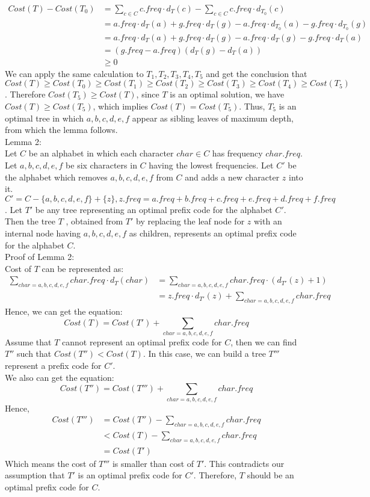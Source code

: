 \documentclass[12pt,letterpaper]{article}
\begin{document}
\begin{align*}
Cost(T) - Cost(T_0) &= \sum _{c \in C} c.freq \cdot d_T(c) -  \sum _{c \in C} c.freq \cdot d_{T_0}(c) \\
&= a.freq \cdot d_T(a) + g.freq \cdot d_T(g) - a.freq \cdot d_{T_0} (a) - g.freq \cdot d_{T_0} (g) \\
&= a.freq \cdot d_T(a) + g.freq \cdot d_T(g) - a.freq \cdot d_{T} (g) - g.freq \cdot d_{T} (a) \\
&= (g.freq - a.freq) (d_T(g) - d_T(a)) \\
& \ge 0
\end{align*}
We can apply the same calculation to $T_1,T_2,T_3,T_4,T_5$ and get the conclusion that $Cost(T) \ge Cost(T_0) \ge Cost(T_1) \ge Cost(T_2) \ge Cost(T_3) \ge Cost(T_4) \ge Cost(T_5)$. Therefore $Cost(T_5) \ge Cost(T)$, since $T$ is an optimal solution, we have $Cost(T) \ge Cost(T_5)$, which implies $Cost(T) = Cost(T_5)$. Thus, $T_5$ is an optimal tree in which $a,b,c,d,e,f$ appear as sibling leaves of maximum depth, from which the lemma follows. \\
Lemma 2: \\
Let $C$ be an alphabet in which each character $char \in C$ has frequency $char.freq$. Let $a,b,c,d,e,f$ be six characters in $C$ having the lowest frequencies. Let $C'$ be the alphabet which removes $a,b,c,d,e,f$ from $C$ and adds a new character $z$ into it. $C' = C - \{a,b,c,d,e,f\} + \{z\}, z.freq = a.freq + b.freq + c.freq + e.freq + d.freq + f.freq $. Let $T'$ be any tree representing an optimal prefix code for the alphabet $C'$. Then the tree $T$ , obtained from $T'$ by replacing the leaf node for  $z$ with an internal node having $a,b,c,d,e,f$ as children, represents an optimal prefix code for the alphabet $C$. \\
Proof of Lemma 2: \\
Cost of $T$ can be represented as:
\begin{align*}
\sum _{char = a,b,c,d,e,f} char.freq \cdot d_T(char) &= \sum _{char = a,b,c,d,e,f} char.freq \cdot (d_{T'} (z) + 1) \\
&= z.freq \cdot d_{T'} (z) + \sum _{char = a,b,c,d,e,f} char.freq
\end{align*}
Hence, we can get the equation:
$$Cost(T) = Cost(T') + \sum _{char = a,b,c,d,e,f} char.freq$$
Assume that $T$ cannot represent an optimal prefix code for $C$, then we can find $T''$ such that $Cost(T'') < Cost(T)$. In this case, we can build a tree $T'''$ represent a prefix code for $C'$. \\
We also can get the equation: 
$$Cost(T'') = Cost(T''') + \sum _{char = a,b,c,d,e,f} char.freq$$
Hence,
\begin{align*}
Cost(T''') &= Cost(T'') - \sum _{char = a,b,c,d,e,f} char.freq \\
&< Cost(T) -  \sum _{char = a,b,c,d,e,f} char.freq \\
&= Cost(T')
\end{align*}
Which means the cost of $T'''$ is smaller than cost of $T'$. This contradicts our assumption that $T'$ is an optimal prefix code for $C'$. Therefore, $T$ should be an optimal prefix code for $C$.
\end{document}
